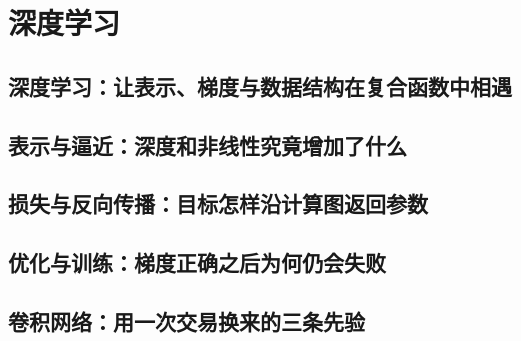 \documentclass[UTF8,openany]{ctexbook}
\theoremstyle{definition}
\theoremstyle{plain}
\begin{document}
\part{深度学习}
\chapter*{深度学习：让表示、梯度与数据结构在复合函数中相遇}
\label{ch:122}

\clearpage
\chapter*{表示与逼近：深度和非线性究竟增加了什么}
\label{ch:123}



\clearpage
\chapter*{损失与反向传播：目标怎样沿计算图返回参数}
\label{ch:124}



\clearpage
\chapter*{优化与训练：梯度正确之后为何仍会失败}
\label{ch:125}




\clearpage
\chapter*{卷积网络：用一次交易换来的三条先验}
\label{ch:126}






\clearpage
\end{document}
